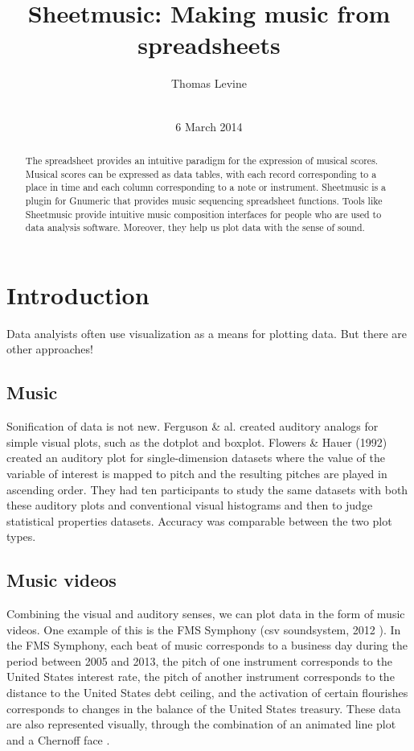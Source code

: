 \documentclass{acm_proc_article-sp}
\begin{document}
\title{Sheetmusic: Making music from spreadsheets}
\author{
\alignauthor
Thomas Levine\\
       \\
}
\date{6 March 2014}
\maketitle
\begin{abstract}
The spreadsheet provides an intuitive paradigm for the expression of musical
scores. Musical scores can be expressed as data tables, with each record
corresponding to a place in time and each column corresponding to a note
or instrument. Sheetmusic is a plugin for Gnumeric that provides music
sequencing spreadsheet functions. Tools like Sheetmusic provide intuitive
music composition interfaces for people who are used to data analysis software.
Moreover, they help us plot data with the sense of sound.
\end{abstract}
\section{Introduction}
Data analyists often use visualization as a means for plotting data.
But there are other approaches!

\subsection{Music}
Sonification of data is not new.
Ferguson \& al. \cite{ferguson} created auditory analogs for simple
visual plots, such as the dotplot and boxplot.
Flowers \& Hauer (1992) \cite{flowers1992} created an auditory plot for
single-dimension datasets where the value of the variable of interest
is mapped to pitch and the resulting pitches are played in ascending
order. They had ten participants to study the same datasets with both
these auditory plots and conventional visual histograms and then to
judge statistical properties datasets. Accuracy was comparable between
the two plot types.

\subsection{Music videos}
Combining the visual and auditory senses, we can plot data in the form
of music videos. One example of this is the FMS Symphony
(csv soundsystem, 2012 \cite{fms}).
In the FMS Symphony, each beat of music corresponds to a business day
during the period between 2005 and 2013, the pitch of one instrument
corresponds to the United States interest rate, the pitch of another
instrument corresponds to the distance to the United States debt ceiling,
and the activation of certain flourishes corresponds to changes in the
balance of the United States treasury. These data are also represented
visually, through the combination of an animated line plot and a
Chernoff face \cite{fms-about}.
\end{document}
